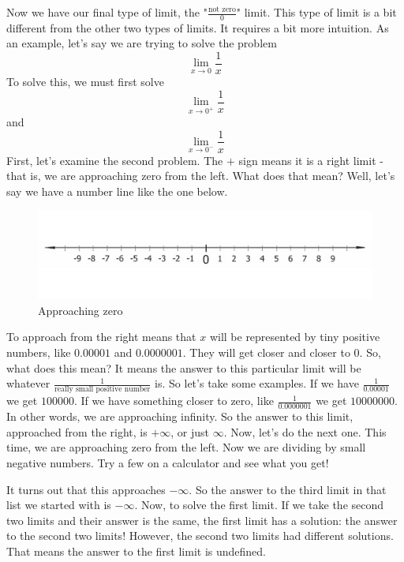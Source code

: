 Now we have our final type of limit, the "$\frac{\text{not zero}}{0}$" limit. 
This type of limit is a bit different from the other two types of limits. 
It requires a bit more intuition. As an example, let's say we are trying to solve the problem
\begin{equation*}
    \lim\limits_{x\rightarrow 0}\frac{1}{x}
\end{equation*}
To solve this, we must first solve
\begin{equation*}
    \lim\limits_{x\rightarrow 0^+}\frac{1}{x}
\end{equation*}
and
\begin{equation*}
    \lim\limits_{x\rightarrow 0^-}\frac{1}{x}
\end{equation*}
First, let's examine the second problem. 
The $+$ sign means it is a right limit - that is, we are approaching zero from the left. 
What does that mean? Well, let's say we have a number line like the one below.

\begin{figure}[H]
\caption{Approaching zero}
\includegraphics[scale=0.75]{numberline.jpg}
\end{figure}

To approach from the right means that $x$ will be represented by tiny positive numbers, like $0.00001$ and $0.0000001$. 
They will get closer and closer to $0$. 
So, what does this mean? 
It means the answer to this particular limit will be whatever $\frac{1}{\text{really small positive number}}$ is. 
So let's take some examples. 
If we have $\frac{1}{0.00001}$ we get $100000$. 
If we have something closer to zero, like $\frac{1}{0.0000001}$ we get $10000000$. 
In other words, we are approaching infinity.
So the answer to this limit, approached from the right, is $+\infty$, or just $\infty$. 
Now, let's do the next one. 
This time, we are approaching zero from the left. Now we are dividing by small negative numbers. Try a few on a calculator and see what you get!

It turns out that this approaches $-\infty$. 
So the answer to the third limit in that list we started with is $-\infty$. 
Now, to solve the first limit. 
If we take the second two limits and their answer is the same, the first limit has a solution: the answer to the second two limits! 
However, the second two limits had different solutions. That means the answer to the first limit is undefined.
